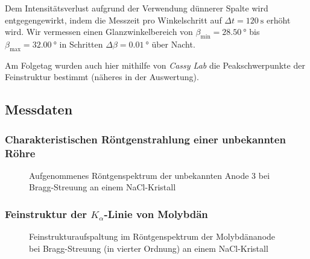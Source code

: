 \documentclass[11pt, a4paper]{article}
\begin{document}
Dem Intensitätsverlust aufgrund der Verwendung dünnerer Spalte wird entgegengewirkt, indem die Messzeit pro Winkelschritt auf $\Delta t = \SI{120}{\second}$ erhöht wird.
Wir vermessen einen Glanzwinkelbereich von $\beta_\mathrm{min} = \SI{28,50}{\degree}$ bis $\beta_\mathrm{max} = \SI{32,00}{\degree}$ in Schritten $\Delta \beta = \SI{0,01}{\degree}$ über Nacht.

Am Folgetag wurden auch hier mithilfe von \emph{Cassy Lab} die Peakschwerpunkte der Feinstruktur bestimmt (näheres in der Auswertung).

\subsection{Messdaten}
\subsubsection{Charakteristischen Röntgenstrahlung einer unbekannten Röhre}

\begin{figure}[!h]
\centering
\resizebox{\columnwidth}{!}{%
}
\caption{Aufgenommenes Röntgenspektrum der unbekannten Anode 3 bei Bragg-Streuung an einem NaCl-Kristall}
\label{fig:anode3}
\end{figure}

\begin{table}[!h]
\centering

\caption{Peakschwerpunkte des charakteristischen Röntgenspektrums (Abbildung \ref{fig:anode3}) der unbekannten Anode}
\label{tab:peakschwerpunkt_grobstruktur}
\end{table}

\subsubsection{Feinstruktur der $K_\alpha$-Linie von Molybdän}

\begin{figure}[!h]
\centering
\resizebox{\columnwidth}{!}{%
}
\caption{Feinstrukturaufspaltung im Röntgenspektrum der Molybdänanode bei Bragg-Streuung (in vierter Ordnung) an einem NaCl-Kristall}
\label{fig:feinstruktur}
\end{figure}

\begin{table}[!h]
\centering

\caption{Peakschwerpunkte in der Feinstruktur der Molybdänanode (in vierter Ordnung)}
\label{tab:peakschwerpunkt_feinstruktur}
\end{table}
\end{document}
